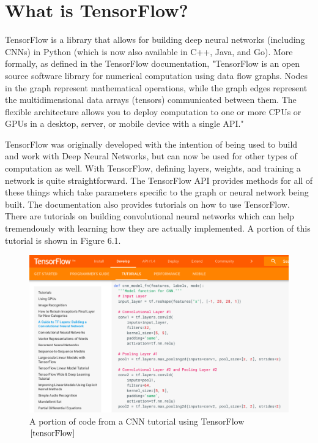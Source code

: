 \documentclass[12pt]{report} %
\begin{document}
\section{What is TensorFlow?}
	TensorFlow is a library that allows for building deep neural networks (including CNNs) in Python (which is now also available in C++, Java, and Go). More formally, as defined in the TensorFlow documentation,  "TensorFlow is an open source software library for numerical computation using data flow graphs. Nodes in the graph represent mathematical operations, while the graph edges represent the multidimensional data arrays (tensors) communicated between them. The flexible architecture allows you to deploy computation to one or more CPUs or GPUs in a desktop, server, or mobile device with a single API."\cite{tensorFlow}
	
	TensorFlow was originally developed with the intention of being used to build and work with Deep Neural Networks, but can now be used for other types of computation as well. With TensorFlow, defining layers, weights, and training a network is quite straightforward. The TensorFlow API provides methods for all of these things which take parameters specific to the graph or neural network being built. The documentation also provides tutorials on how to use TensorFlow. There are tutorials on building convolutional neural networks which can help tremendously with learning how they are actually implemented. A portion of this tutorial is shown in Figure 6.1.\cite{tensorFlow}
\begin{figure}
\centering
\includegraphics[width=5in]{tensorflow_cnn}
\caption{A portion of code from a  CNN tutorial using TensorFlow$\cite{tensorFlow}$}
\end{figure}	
\end{document}
